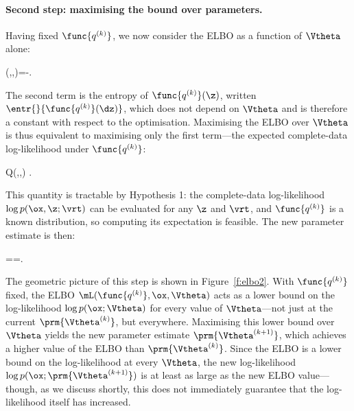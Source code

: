 \paragraph{Second step: maximising the bound over parameters.}
Having fixed $\func{q^{(k)}}$, we now consider the ELBO as a function of $\Vtheta$ alone:
\begin{myequation}
\mL(,\ox,\Vtheta)=-.
\end{myequation}
The second term is the entropy of $\func{q^{(k)}}(\z)$, written $\entr{}{\func{q^{(k)}}(\dz)}$,
which does not depend on $\Vtheta$ and is therefore a constant with respect to the
optimisation. Maximising the ELBO over $\Vtheta$ is thus equivalent to maximising only
the first term---the expected complete-data log-likelihood under $\func{q^{(k)}}$:
\begin{myequation}
Q(,\ox,\vrt)  {}.
\end{myequation}
This quantity is tractable by Hypothesis 1: the complete-data log-likelihood $\log
p(\ox,\z;\vrt)$ can be evaluated for any $\z$ and $\vrt$, and $\func{q^{(k)}}$ is a known
distribution, so computing its expectation is feasible. The new parameter estimate is then:
\begin{myequation}
  ==.
\end{myequation}

The geometric picture of this step is shown in Figure~\ref{f:elbo2}. With $\func{q^{(k)}}$
fixed, the ELBO $\mL(\func{q^{(k)}},\ox,\Vtheta)$ acts as a lower bound on the
log-likelihood $\log p(\ox;\Vtheta)$ for every value of $\Vtheta$---not just at the current
$\prm{\Vtheta^{(k)}}$, but everywhere. Maximising this lower bound over $\Vtheta$ yields
the new parameter estimate $\prm{\Vtheta^{(k+1)}}$, which achieves a higher value of
the ELBO than $\prm{\Vtheta^{(k)}}$. Since the ELBO is a lower bound on the
log-likelihood at every $\Vtheta$, the new log-likelihood $\log
p(\ox;\prm{\Vtheta^{(k+1)}})$ is at least as large as the new ELBO value---though, as we
discuss shortly, this does not immediately guarantee that the log-likelihood itself has
increased.

